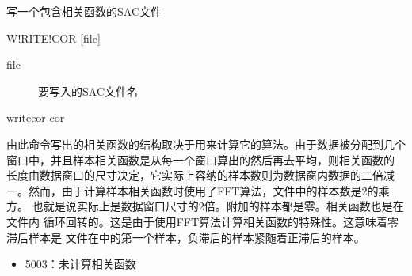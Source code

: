 \label{spe:writecor}

写一个包含相关函数的SAC文件

\begin{SACSTX}
W!RITE!COR [file]
\end{SACSTX}

\begin{description}
\item [file] 要写入的SAC文件名
\end{description}

\begin{SACDFT}
writecor cor
\end{SACDFT}

由此命令写出的相关函数的结构取决于用来计算它的算法。由于数据被分配到几个
窗口中，并且样本相关函数是从每一个窗口算出的然后再去平均，则相关函数的
长度由数据窗口的尺寸决定，它实际上容纳的样本数则为数据窗内数据的二倍减
一。然而，由于计算样本相关函数时使用了FFT算法，文件中的样本数是2的乘方。
也就是说实际上是数据窗口尺寸的2倍。附加的样本都是零。相关函数也是在文件内
循环回转的。这是由于使用FFT算法计算相关函数的特殊性。这意味着零滞后样本是
文件在中的第一个样本，负滞后的样本紧随着正滞后的样本。

\begin{itemize}
\item 5003：未计算相关函数
\end{itemize}
